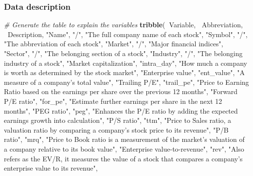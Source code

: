 \documentclass[11pt,a4paper,]{article}
\newenvironment{Shaded}{\begin{snugshade}}{\end{snugshade}}
\newcommand{\CommentTok}[1]{\textcolor[rgb]{0.56,0.35,0.01}{\textit{#1}}}
\newcommand{\KeywordTok}[1]{\textcolor[rgb]{0.13,0.29,0.53}{\textbf{#1}}}
\newcommand{\NormalTok}[1]{#1}
\newcommand{\OperatorTok}[1]{\textcolor[rgb]{0.81,0.36,0.00}{\textbf{#1}}}
\newcommand{\StringTok}[1]{\textcolor[rgb]{0.31,0.60,0.02}{#1}}
\begin{document}
\hypertarget{data-description-1}{%
\subsubsection{Data description}\label{data-description-1}}

\begin{Shaded}
\begin{Highlighting}[]
\CommentTok{# Generate the table to explain the variables}
\KeywordTok{tribble}\NormalTok{(}\OperatorTok{~}\NormalTok{Variable, }\OperatorTok{~}\NormalTok{Abbreviation, }\OperatorTok{~}\NormalTok{Description,}
        \StringTok{"Name"}\NormalTok{, }\StringTok{"/"}\NormalTok{, }\StringTok{"The full company name of each stock"}\NormalTok{,}
        \StringTok{"Symbol"}\NormalTok{, }\StringTok{"/"}\NormalTok{, }\StringTok{"The abbreviation of each stock"}\NormalTok{,}
        \StringTok{"Market"}\NormalTok{, }\StringTok{"/"}\NormalTok{, }\StringTok{"Major financial indices"}\NormalTok{,}
        \StringTok{"Sector"}\NormalTok{, }\StringTok{"/"}\NormalTok{, }\StringTok{"The belonging section of a stock"}\NormalTok{,}
        \StringTok{"Industry"}\NormalTok{, }\StringTok{"/"}\NormalTok{, }\StringTok{"The belonging industry of a stock"}\NormalTok{,}
        \StringTok{"Market capitalization"}\NormalTok{, }\StringTok{"intra_day"}\NormalTok{, }\StringTok{"How much a company is worth as determined by the stock market"}\NormalTok{, }
        \StringTok{"Enterprise value"}\NormalTok{, }\StringTok{"ent_value"}\NormalTok{, }\StringTok{"A measure of a company's total value"}\NormalTok{, }
        \StringTok{"Trailing P/E"}\NormalTok{, }\StringTok{"trail_pe"}\NormalTok{,  }\StringTok{"Price to Earning Ratio based on the earnings per share over the previous 12 months"}\NormalTok{,}
        \StringTok{"Forward P/E ratio"}\NormalTok{, }\StringTok{"for_pe"}\NormalTok{,  }\StringTok{"Estimate further earnings per share in the next 12 months"}\NormalTok{, }
        \StringTok{"PEG ratio"}\NormalTok{, }\StringTok{"peg"}\NormalTok{, }\StringTok{"Enhances the P/E ratio by adding the expected earnings growth into calculation"}\NormalTok{, }
        \StringTok{"P/S ratio"}\NormalTok{, }\StringTok{"ttm"}\NormalTok{, }\StringTok{"Price to Sales ratio, a valuation ratio by comparing a company’s stock price to its revenue"}\NormalTok{, }
        \StringTok{"P/B ratio"}\NormalTok{,  }\StringTok{"mrq"}\NormalTok{, }\StringTok{"Price to Book ratio is a measurement of the market's valuation of a company relative to its book value"}\NormalTok{,}
        \StringTok{"Enterprise value-to-revenue"}\NormalTok{,  }\StringTok{"rev"}\NormalTok{, }\StringTok{"Also refers as the EV/R, it measures the value of a stock that compares a company's enterprise value to its revenue"}\NormalTok{, }

\end{Highlighting}
\end{Shaded}
\end{document}
